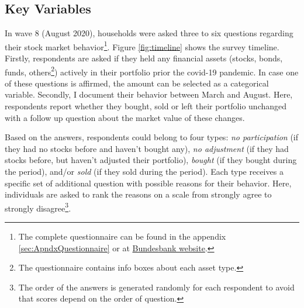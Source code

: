\documentclass[ProjectABM]{subfiles}
\begin{document}
\subsection{Key Variables}
In wave 8 (August 2020), households were asked three to six questions regarding their stock market behavior\footnote{The complete questionnaire can be found in the appendix \ref{sec:ApndxQuestionnaire} or at \href{https://www.bundesbank.de/en/bundesbank/research/survey-on-consumer-expectations/questionnaires-850746}{Bundesbank website}.}. Figure \ref{fig:timeline} shows the survey timeline. Firstly, respondents are asked if they held any financial assets (stocks, bonds, funds, others\footnote{The questionnaire contains info boxes about each asset type.}) actively in their portfolio prior the covid-19 pandemic. In case one of these questions is affirmed, the amount can be selected as a categorical variable. Secondly, I document their behavior between March and August. Here, respondents report whether they bought, sold or left their portfolio unchanged with a follow up question about the market value of these changes. %

Based on the answers, respondents could belong to four types: \textit{no participation} (if they had no stocks before and haven't bought any), \textit{no adjustment} (if they had stocks before, but haven't adjusted their portfolio), \textit{bought} (if they bought during the period), and/or \textit{sold} (if they sold during the period). Each type receives a specific set of additional question with possible reasons for their behavior. Here, individuals are asked to rank the reasons on a scale from strongly agree to strongly disagree\footnote{The order of the answers is generated randomly for each respondent to avoid that scores depend on the order of question.}.




\end{document}
